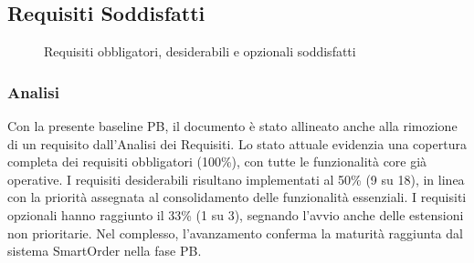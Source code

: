 \documentclass[a4paper,11pt,oneside]{scrartcl}
\begin{document}
\subsection{Requisiti Soddisfatti}

\begin{figure}[H]
\centering


\caption{Requisiti obbligatori, desiderabili e opzionali soddisfatti}
\label{fig:requisiti_soddisfatti}
\end{figure}

\subsubsection*{Analisi}

Con la presente baseline PB, il documento è stato allineato anche alla rimozione di un requisito dall'Analisi dei Requisiti. Lo stato attuale evidenzia una copertura completa dei requisiti obbligatori (100\%), con tutte le funzionalità core già operative. I requisiti desiderabili risultano implementati al 50\% (9 su 18), in linea con la priorità assegnata al consolidamento delle funzionalità essenziali. I requisiti opzionali hanno raggiunto il 33\% (1 su 3), segnando l'avvio anche delle estensioni non prioritarie. Nel complesso, l'avanzamento conferma la maturità raggiunta dal sistema SmartOrder nella fase PB.
\end{document}
